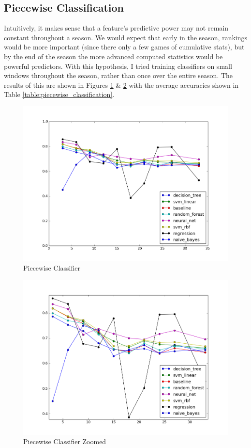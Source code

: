 \documentclass[]{article}
\begin{document}
\subsection{Piecewise Classification}
\label{subsec:piecewise}

Intuitively, it makes sense that a feature's predictive power may not remain constant throughout a season. We would expect that early in the season, rankings would be more important (since there only a few games of cumulative stats), but by the end of the season the more advanced computed statistics would be powerful predictors. With this hypothesis, I tried training classifiers on small windows throughout the season, rather than once over the entire season. The results of this are shown in Figures \ref{fig:piecewise} \& \ref{fig:piecewise_zoom} with the average accuracies shown in Table \ref{table:piecewise_classification}.

\begin{figure}[ht]
	\centering
	\includegraphics[width=.65\linewidth]{piecewise_classifier.png}
	\caption{Piecewise Classifier}
	\label{fig:piecewise}
\end{figure}

\begin{figure}[ht]
	\centering
	\includegraphics[width=.65\linewidth]{piecewise_classifier_zoom.png}
	\caption{Piecewise Classifier Zoomed}
	\label{fig:piecewise_zoom}
\end{figure}
\end{document}

